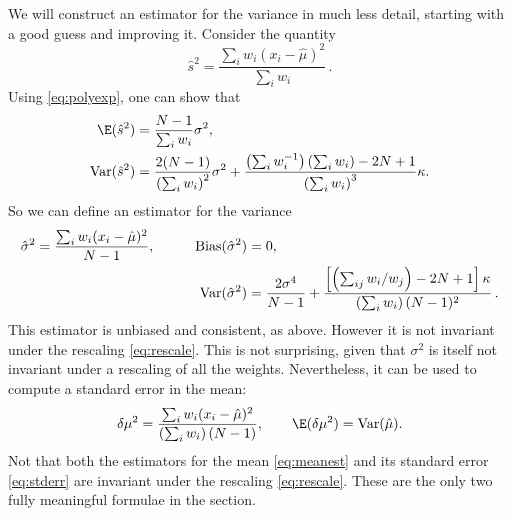\documentclass[12pt]{article}
\DeclareMathOperator{\bias}{Bias}
\DeclareMathOperator{\var}{Var}
\newcommand{\mh}{\hat\mu}
\newcommand{\sh}{\hat{s}}
\newcommand{\sih}{\hat{\sigma}}
\begin{document}
We will construct an estimator for the variance in much less detail, starting with a good guess and improving it. Consider the quantity
%
\begin{equation}\label{eq:varestguess}
  \sh^2 = \frac{\sum_i w_i (x_i-\mh)^2}{\sum_i w_i}\,.
\end{equation}
%
Using \eqref{eq:polyexp}, one can show that
%
\begin{equation}\label{eq:varestmoments}
 \begin{aligned}
  \E(\sh^2) &= \frac{N-1}{\sum_i w_i} \sigma^2, \\
  \var(\sh^2) &= \frac{2(N-1)}{\prn{\sum_i w_i}^2} \sigma^2 + \frac{\prn{\sum_i w_i^{-1}}\prn{\sum_i w_i} - 2N + 1}{\prn{\sum_i w_i}^3}\kappa.
 \end{aligned}
\end{equation}
%
So we can define an estimator for the variance
%
\begin{equation}\label{eq:varest}
 \begin{aligned}
  \sih^2 &= \frac{\sum_i w_i (x_i-\mh)^2}{N-1}, \qquad&
  \bias(\sih^2) &= 0, \\ & &
  \var(\sih^2) &= \frac{2\sigma^4}{N-1} + \frac{\brk{\prn{\sum_{ij} w_i/w_j} - 2N + 1}\kappa}{\prn{\sum_i w_i}(N-1)^2}\,.
 \end{aligned}
\end{equation}
%
This estimator is unbiased and consistent, as above. However it is not invariant under the rescaling \eqref{eq:rescale}. This is not surprising, given that $\sigma^2$ is itself not invariant under a rescaling of all the weights. Nevertheless, it can be used to compute a standard error in the mean:
%
\begin{equation}\label{eq:stderr}
  \delta\mu^2 = \frac{\sum_i w_i (x_i-\mh)^2}{\prn{\sum_i w_i}(N-1)}, \qquad
  \E(\delta\mu^2) = \var(\mh).
\end{equation}
%
Not that both the estimators for the mean \eqref{eq:meanest} and its standard error \eqref{eq:stderr} are invariant under the rescaling \eqref{eq:rescale}. These are the only two fully meaningful formulae in the section.













%
%
\end{document}
